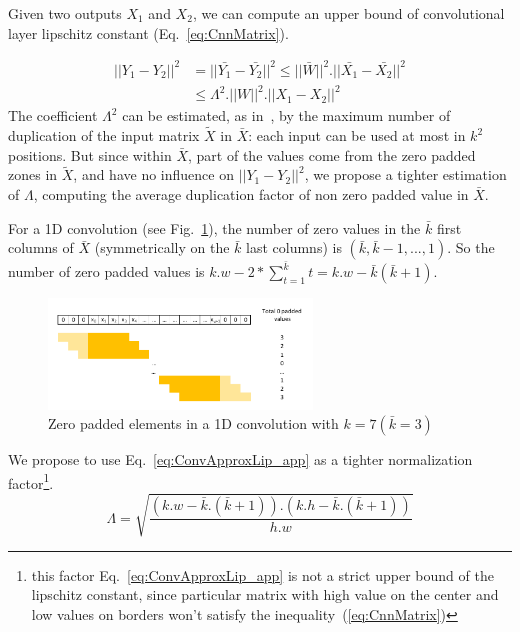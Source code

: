 Given two outputs $X_1$ and $X_2$,  we can compute an upper bound of convolutional layer lipschitz constant (Eq.~\ref{eq:CnnMatrix}). 

\begin{equation} 
\begin{split}
||Y_1-Y_2||^2 &= ||\bar{Y_1} - \bar{Y_2}||^2 \leq ||\bar{W}||^2.||\bar{X_1}-\bar{X_2}||^2  \\
&\leq \Lambda^2.||W||^2.||X_1-X_2||^2
\end{split} 
\label{eq:CnnMatrix}\end{equation}
The coefficient $\Lambda^2$ can be estimated, as in~\cite{cisse_parseval_2017}, by the maximum number of duplication of the input matrix $\widetilde{X}$ in  $\bar{X}$: each input can be used at most in $k^2$ positions. But since within  $\bar{X}$, part of the values come from the zero padded zones in $\widetilde{X}$, and have no influence on $||Y_1-Y_2||^2$, we propose a tighter estimation of $\Lambda$, computing the average duplication factor of non zero padded value in  $\bar{X}$.

For a 1D convolution (see Fig.~\ref{fig:conv1DNoStride}), the number of zero values in the $\bar{k}$ first columns of $\bar{X}$ (symmetrically on the $\bar{k}$ last columns) is $(\bar{k},\bar{k}-1,...,1)$. So the number of zero padded values is $k.w-2*\sum_{t=1}^{\bar{k}}t=k.w-\bar{k}(\bar{k}+1)$.
\begin{figure}[htp]
    \centering
    \includegraphics[width=7cm]{img/Conv1D_padding_Nostride}
    \caption{Zero padded elements in a 1D convolution with $k=7 (\bar{k} = 3)$ }
    \label{fig:conv1DNoStride}
\end{figure}

We propose to use Eq.~\ref{eq:ConvApproxLip_app} as a tighter normalization factor\footnote{this factor Eq.~\ref{eq:ConvApproxLip_app} is not a strict upper bound of the lipschitz constant, since particular matrix with high value on the center and low values on borders won't satisfy the inequality~(\ref{eq:CnnMatrix})}.
\begin{equation}
\Lambda=\sqrt{\frac{(k.w-\bar{k}.(\bar{k}+1)).(k.h-\bar{k}.(\bar{k}+1))}{h.w}}
\label{eq:ConvApproxLip_app}
\end{equation}


